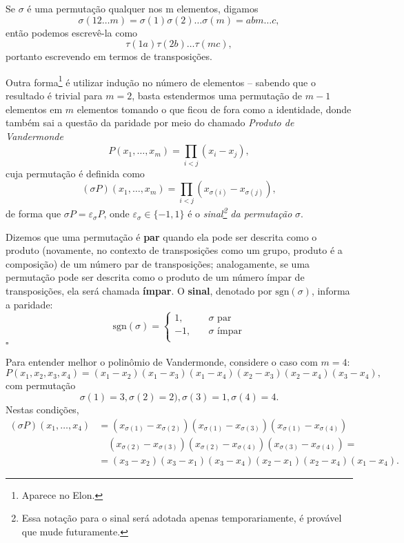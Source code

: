 \documentclass[../differential_forms.tex]{subfiles}
\begin{document}
\begin{proof*}
	Se \(\sigma \) é uma permutação qualquer nos m elementos, digamos
	\[
		\sigma (1 2 \dotsc m) = \sigma(1)\sigma (2)\dotsc \sigma (m) = abm \dotsc c,
	\]
	então podemos escrevê-la como
	\[
		\tau (1a)\tau(2b)\dotsc \tau (mc),
	\]
	portanto escrevendo em termos de transposições.

	Outra forma\footnote{Aparece no Elon.} é utilizar indução no número de elementos -- sabendo que o resultado é trivial para \(m=2\), basta estendermos uma permutação de \(m-1\) elementos em \(m\) elementos tomando o que ficou de fora como a identidade, donde também sai a questão da paridade por meio do chamado \textit{Produto de Vandermonde}
	\[
		P(x_1,\dotsc ,x_{m}) = \prod\limits_{i<j}^{} (x_{i}-x_{j}),
	\]
	cuja permutação é definida como
	\[
		(\sigma P)(x_1, \dotsc , x_{m}) = \prod\limits_{i < j}^{}(x_{\sigma (i)} - x_{\sigma (j)}),
	\]
	de forma que \(\sigma P = \varepsilon_{\sigma }P\), onde \(\varepsilon_{\sigma }\in \{-1, 1\}\) é o \textit{sinal\footnote{Essa notação para o sinal será adotada apenas temporariamente, é provável que mude futuramente.} da permutação }\(\sigma \). \qedsymbol
\end{proof*}
\begin{def*}
	Dizemos que uma permutação é \textbf{par} quando ela pode ser descrita como o produto (novamente, no contexto de transposições como um grupo, produto é a composição) de um número par de transposições; analogamente, se uma permutação pode ser descrita como o produto de um número ímpar de transposições, ela será chamada \textbf{ímpar}. O \textbf{sinal}, denotado por \(\mathrm{sgn}(\sigma )\), informa a paridade:
	\[
		\mathrm{sgn}(\sigma )  = \left\{\begin{array}{ll}
			1,  & \quad \sigma \text{ par}   \\
			-1, & \quad \sigma \text{ ímpar} \\
		\end{array}\right.
	\] \(\square\)
\end{def*}
\begin{example}
	Para entender melhor o polinômio de Vandermonde, considere o caso com \(m=4\):
	\[
		P(x_1, x_2, x_3 , x_4) = (x_1-x_2)(x_1-x_3)(x_1-x_4)(x_2-x_3)(x_2-x_4)(x_3-x_4),
	\]
	com permutação
	\[
		\sigma (1) = 3, \sigma(2) = 2), \sigma (3)=1, \sigma (4) = 4.
	\]
	Nestas condições,
	\begin{align*}
		(\sigma P)(x_1, \dotsc , x_4) & = (x_{\sigma (1)}-x_{\sigma (2)})(x_{\sigma (1)}-x_{\sigma (3)})(x_{\sigma (1)}-x_{\sigma (4)})       \\
		                              & \quad (x_{\sigma (2)}-x_{\sigma (3)})(x_{\sigma (2)}-x_{\sigma (4)})(x_{\sigma (3)}-x_{\sigma (4)}) = \\
		                              & = (x_{3}-x_{2})(x_{3}-x_1)(x_3-x_4)(x_2-x_1)(x_2-x_4)(x_1-x_4).
	\end{align*}
\end{example}
\end{document}
